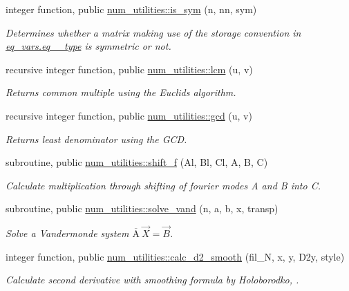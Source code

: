 \begin{DoxyCompactItemize}
integer function, public \hyperlink{namespacenum__utilities_a4e6994b5c92b3d16c8538b54db0beadd}{num\+\_\+utilities\+::is\+\_\+sym} (n, nn, sym)
\begin{DoxyCompactList}\small\item\em Determines whether a matrix making use of the storage convention in \hyperlink{structeq__vars_1_1eq__2__type}{eq\+\_\+vars.\+eq\+\_\+\_\+type} is symmetric or not. \end{DoxyCompactList}\item 
recursive integer function, public \hyperlink{namespacenum__utilities_a33fc1483c840d5d3f9b12acfce21cad1}{num\+\_\+utilities\+::lcm} (u, v)
\begin{DoxyCompactList}\small\item\em Returns common multiple using the Euclid\textquotesingle{}s algorithm. \end{DoxyCompactList}\item 
recursive integer function, public \hyperlink{namespacenum__utilities_a3d0d04a582b3a528fc7f9975d5d2a807}{num\+\_\+utilities\+::gcd} (u, v)
\begin{DoxyCompactList}\small\item\em Returns least denominator using the G\+CD. \end{DoxyCompactList}\item 
subroutine, public \hyperlink{namespacenum__utilities_ac887f1cc7176167b352dedbd22ff2a57}{num\+\_\+utilities\+::shift\+\_\+f} (Al, Bl, Cl, A, B, C)
\begin{DoxyCompactList}\small\item\em Calculate multiplication through shifting of fourier modes A and B into C. \end{DoxyCompactList}\item 
subroutine, public \hyperlink{namespacenum__utilities_a54c65e345182e2e7e13ac14a0ba3647a}{num\+\_\+utilities\+::solve\+\_\+vand} (n, a, b, x, transp)
\begin{DoxyCompactList}\small\item\em Solve a Vandermonde system $\overline{\text{A}} \ \vec{X} = \vec{B}$. \end{DoxyCompactList}\item 
integer function, public \hyperlink{namespacenum__utilities_ab4c91a6478c4dd6f519f8ccbccc4094f}{num\+\_\+utilities\+::calc\+\_\+d2\+\_\+smooth} (fil\+\_\+N, x, y, D2y, style)
\begin{DoxyCompactList}\small\item\em Calculate second derivative with smoothing formula by Holoborodko, \cite{holoborodko2008diff}. \end{DoxyCompactList}\end{DoxyCompactItemize}
